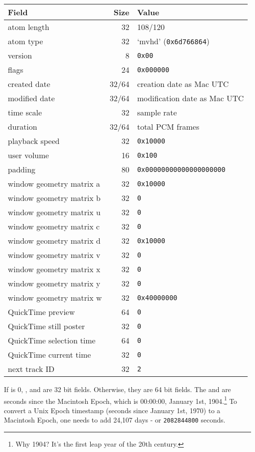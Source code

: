 \begin{table}[h]
\begin{tabular}{|l|r|l|}
\hline
Field & Size & Value \\
\hline
atom length & 32 & 108/120 \\
atom type & 32 & `mvhd' (\texttt{0x6d766864}) \\
\hline
version & 8 & \texttt{0x00} \\
flags & 24 & \texttt{0x000000} \\
created date & 32/64 & creation date as Mac UTC \\
modified date & 32/64 & modification date as Mac UTC \\
time scale & 32 & sample rate \\
duration & 32/64 & total PCM frames \\
playback speed & 32 & \texttt{0x10000} \\
user volume & 16 & \texttt{0x100} \\
padding & 80 & \texttt{0x00000000000000000000} \\
window geometry matrix a & 32 & \texttt{0x10000} \\
window geometry matrix b & 32 & \texttt{0} \\
window geometry matrix u & 32 & \texttt{0} \\
window geometry matrix c & 32 & \texttt{0} \\
window geometry matrix d & 32 & \texttt{0x10000} \\
window geometry matrix v & 32 & \texttt{0} \\
window geometry matrix x & 32 & \texttt{0} \\
window geometry matrix y & 32 & \texttt{0} \\
window geometry matrix w & 32 & \texttt{0x40000000} \\
QuickTime preview & 64 & \texttt{0} \\
QuickTime still poster & 32 & \texttt{0} \\
QuickTime selection time & 64 & \texttt{0} \\
QuickTime current time & 32 & \texttt{0} \\
next track ID & 32 & \texttt{2} \\
\hline
\end{tabular}
\end{table}

If  is 0, ,  and
 are 32 bit fields.
Otherwise, they are 64 bit fields.
The  and  are seconds
since the Macintosh Epoch, which is 00:00:00, January 1st, 1904.\footnote{Why 1904?  It's the first leap year of the 20th century.}
To convert a Unix Epoch timestamp (seconds since January 1st, 1970) to
a Macintosh Epoch, one needs to add 24,107 days -
or \texttt{2082844800} seconds.

